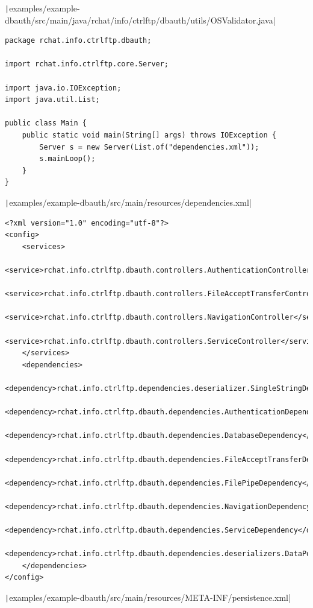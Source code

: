\documentclass[a4paper,14pt]{extarticle}
\begin{document}
\texttt|examples/example-dbauth/src/main/java/rchat/info/ctrlftp/dbauth/utils/OSValidator.java|
\begin{verbatim}
package rchat.info.ctrlftp.dbauth;

import rchat.info.ctrlftp.core.Server;

import java.io.IOException;
import java.util.List;

public class Main {
    public static void main(String[] args) throws IOException {
        Server s = new Server(List.of("dependencies.xml"));
        s.mainLoop();
    }
}
\end{verbatim}
\texttt|examples/example-dbauth/src/main/resources/dependencies.xml|
\begin{verbatim}
<?xml version="1.0" encoding="utf-8"?>
<config>
    <services>
        <service>rchat.info.ctrlftp.dbauth.controllers.AuthenticationController</service>
        <service>rchat.info.ctrlftp.dbauth.controllers.FileAcceptTransferController</service>
        <service>rchat.info.ctrlftp.dbauth.controllers.NavigationController</service>
        <service>rchat.info.ctrlftp.dbauth.controllers.ServiceController</service>
    </services>
    <dependencies>
        <dependency>rchat.info.ctrlftp.dependencies.deserializer.SingleStringDeserializer</dependency>
        <dependency>rchat.info.ctrlftp.dbauth.dependencies.AuthenticationDependency</dependency>
        <dependency>rchat.info.ctrlftp.dbauth.dependencies.DatabaseDependency</dependency>
        <dependency>rchat.info.ctrlftp.dbauth.dependencies.FileAcceptTransferDependency</dependency>
        <dependency>rchat.info.ctrlftp.dbauth.dependencies.FilePipeDependency</dependency>
        <dependency>rchat.info.ctrlftp.dbauth.dependencies.NavigationDependency</dependency>
        <dependency>rchat.info.ctrlftp.dbauth.dependencies.ServiceDependency</dependency>
        <dependency>rchat.info.ctrlftp.dbauth.dependencies.deserializers.DataPortDeserializer</dependency>
    </dependencies>
</config>
\end{verbatim}
\texttt|examples/example-dbauth/src/main/resources/META-INF/persistence.xml|
\end{document}
